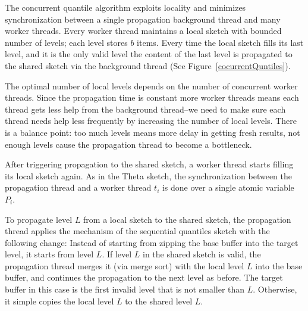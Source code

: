 The concurrent quantile algorithm exploits locality and minimizes
synchronization between a single propagation
background thread and many worker threads.
Every worker thread maintains a local sketch with bounded number
of levels; each level stores $b$ items. 
Every time the local sketch fills its last level, and it is the only valid level the content of the last level is propagated to the
shared sketch via the background thread (See Figure~\ref{cocurrentQuntiles}).

The optimal number of local levels depends on the number of
concurrent worker threads.
Since  the propagation time is constant more worker threads means each thread gets
less help from the background thread--we need to make sure each thread needs help
less frequently by increasing the number of
local levels. There is a balance point: too much levels means more delay in getting fresh results, not enough levels cause the propagation thread to become a bottleneck.

After triggering propagation to the shared sketch,
a worker thread starts filling its local sketch again.
As in the Theta sketch, the synchronization between the
propagation thread and a worker thread $t_i$ is done over a
single atomic variable $P_i$.

To propagate level $L$ from a local sketch to the shared sketch,
the propagation thread applies the mechanism of the
sequential quantiles sketch with the following
change:
Instead of starting from zipping the base buffer
into the target level, it starts from level $L$.
If level $L$ in the shared sketch is valid, the propagation
thread merges it (via merge sort) with the local level $L$ into
the base buffer, and continues the propagation to the next level
as before.
The target buffer in this case is the first invalid level that is
not smaller than $L$.
Otherwise, it simple copies the local level $L$ to the shared level
$L$.

